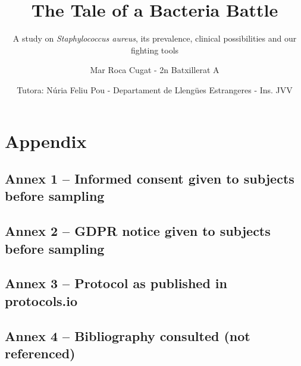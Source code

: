 \documentclass[fontsize=12pt,twoside=semi,openright,numbers=noenddot,parskip=half]{scrbook}
\title{The Tale of a Bacteria Battle}
\subtitle{A study on \emph{Staphylococcus aureus}, its prevalence, clinical possibilities and our fighting tools}
\author{Mar Roca Cugat - 2n Batxillerat A}
\date{Tutora: Núria Feliu Pou - Departament de Llengües Estrangeres - Ins. JVV}
\begin{document}
\maketitle
\cleardoublepage
\renewcommand{\thepage}{\arabic{page}}
\frontmatter
\mainmatter\printindex\tableofcontents





%
%
\backmatter
\renewcommand{\thepage}{\Roman{page}}\setcounter{page}{0}
\clearpage
\printbibliography[title={Works referenced}]
\part{Appendix}\appendix
\chapter{Annex 1 – Informed consent given to subjects before sampling}

\clearpage\appendix\chapter{Annex 2 – GDPR notice given to subjects before sampling}

\chapter{Annex 3 – Protocol as published in protocols.io}

\chapter{Annex 4 – Bibliography consulted (not referenced)}

\end{document}
